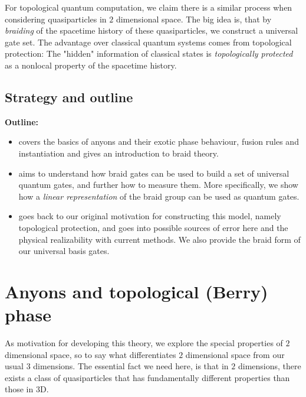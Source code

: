 \documentclass{article}
\begin{document}
For topological quantum computation, we claim there is a similar process when considering quasiparticles in $2$ dimensional space. The big idea is, that by {\it braiding} of the spacetime history of these quasiparticles, we construct a universal gate set. The advantage over classical quantum systems comes from topological protection: The "hidden" information of classical states is {\it topologically protected} as a nonlocal property of the spacetime history.

\subsection{Strategy and outline}
{\bf Outline:}
\begin{itemize}
  \item[{\bf\cref{AnyonsAndTopologicalBerryPhase}}] covers the basics of anyons and their exotic phase behaviour, fusion rules and instantiation and gives an introduction to braid theory.
  \item[{\bf\cref{BraidGatesAndUniversality}}] aims to understand how braid gates can be used to build a set of universal quantum gates, and further how to measure them. More specifically, we show how a {\it linear representation} of the braid group can be used as quantum gates.
  \item[{\bf\cref{Conclusion}}] goes back to our original motivation for constructing this model, namely topological protection, and goes into possible sources of error here and the physical realizability with current methods. We also provide the braid form of our universal basis gates.
\end{itemize}
\section{Anyons and topological (Berry) phase}
\label{AnyonsAndTopologicalBerryPhase}

As motivation for developing this theory, we explore the special properties of $2$ dimensional space, so to say what differentiates $2$ dimensional space from our usual $3$ dimensions. The essential fact we need here, is that in $2$ dimensions, there exists a class of quasiparticles that has fundamentally different properties than those in $3$D.
\end{document}

